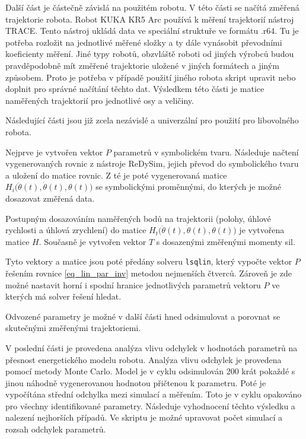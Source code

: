 Další část je částečně závislá na použitém robotu. V této části se načítá změřená trajektorie robota. Robot KUKA KR5 Arc používá k měření trajektorií nástroj TRACE. Tento nástroj ukládá data ve speciální struktuře ve formátu .r64. Tu je potřeba rozložit na jednotlivé měřené složky a ty dále vynásobit převodními koeficienty měření. Jiné typy robotů, obzvláště roboti od jiných výrobců budou pravděpodobně mít změřené trajektorie uložené v jiných formátech a jiným způsobem. Proto je potřeba v případě použití jiného robota skript upravit nebo doplnit pro správné načítání těchto dat. Výsledkem této části je matice naměřených trajektorií pro jednotlivé osy a veličiny. 

Následující části jsou již zcela nezávislé a univerzální pro použití pro libovolného robota.  

Nejprve je vytvořen vektor $P$ parametrů v symbolickém tvaru. Následuje načtení vygenerovaných rovnic z nástroje ReDySim, jejich převod do symbolického tvaru a uložení do matice rovnic. Z té je poté vygenerovaná matice $H_i\big(\ddot{\theta}(t),\dot{\theta}(t),\theta(t)\big)$ se symbolickými proměnnými, do kterých je možné dosazovat změřená data.

Postupným dosazováním naměřených bodů na trajektorii (polohy, úhlové rychlosti a úhlová zrychlení) do matice $H_t\big(\ddot{\theta}(t),\dot{\theta}(t),\theta(t)\big)$ je vytvořena matice $H$. Současně je vytvořen vektor $T$ s dosazenými změřenými momenty sil.

Tyto vektory a matice jsou poté předány solveru \texttt{lsqlin}, který vypočte vektor $P$ řešením rovnice \ref{eq_lin_par_inv} metodou nejmenších čtverců. Zároveň je zde možné nastavit horní i spodní hranice jednotlivých parametrů vektoru $P$ ve kterých má solver řešení hledat.

Odvozené parametry je možné v další části hned odsimulovat a porovnat se skutečnými změřenými trajektoriemi.

V poslední části je provedena analýza vlivu odchylek v hodnotách parametrů na přesnost energetického modelu robotu. Analýza vlivu odchylek je provedena pomocí metody Monte Carlo. Model je v cyklu odsimulován 200 krát pokaždé s jinou náhodně vygenerovanou hodnotou přičtenou k parametru. Poté je vypočítána střední odchylka mezi simulací a měřením. Toto je v cyklu opakováno pro všechny identifikované parametry. Následuje vyhodnocení těchto výsledku a nalezení nejhorších případů.
Ve skriptu je možné upravovat počet simulací a rozsah odchylek parametrů.  

